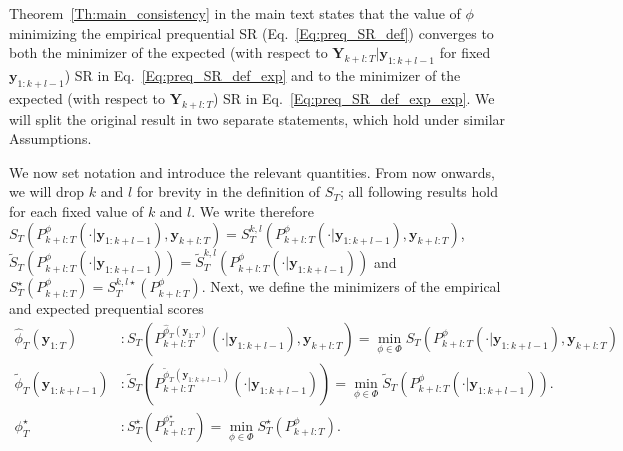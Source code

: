 \documentclass[twoside,11pt]{article}
\newcommand{\ddobs}{\mathbf{y}}
\newcommand{\ddobsupkplusl}{\mathbf{y}_{1:k+l-1}}
\newcommand{\DdobsupTfromk}{\mathbf{Y}_{k+l:T}}
\newcommand{\ddobsupT}{\mathbf{y}_{1:T}}
\newcommand{\ddobsupTfromk}{\mathbf{y}_{k+l:T}}
\begin{document}
	Theorem~\ref{Th:main_consistency} in the main text states that the value of $ \phi $ minimizing the empirical prequential SR (Eq.~\eqref{Eq:preq_SR_def}) converges to both the minimizer of the expected (with respect to $ \DdobsupTfromk|\ddobsupkplusl $ for fixed $ \ddobsupkplusl $) SR in Eq.~\eqref{Eq:preq_SR_def_exp} and to the minimizer of the expected (with respect to $ \DdobsupTfromk $) SR in Eq.~\eqref{Eq:preq_SR_def_exp_exp}. We will split the original result in two separate statements, which hold under similar Assumptions. 
	
	We now set notation and introduce the relevant quantities. From now onwards, we will drop $ k $ and $ l $ for brevity in the definition of $ S_T $; all following results hold for each fixed value of $ k $ and $ l $. We write therefore $ S_T(P_{k+l:T}^\phi(\cdot|\ddobs_{1:k+l-1}), \ddobs_{k+l:T}) = S_T^{k,l}(P_{k+l:T}^\phi(\cdot|\ddobs_{1:k+l-1}), \ddobs_{k+l:T}) $, $ 	\tilde S_T(P^\phi_{k+l:T}(\cdot|\ddobs_{1:k+l-1})) = 	\tilde S_T^{k,l}(P^\phi_{k+l:T}(\cdot|\ddobs_{1:k+l-1})) $ and $ S_T^{\star}(P^\phi_{k+l:T}) = S_T^{k,l\star}(P^\phi_{k+l:T})  $.
	Next, we define the minimizers of the empirical and expected prequential scores
	\begin{equation}\label{Eq:def_minimizers}
	\begin{aligned}
	\hat \phi_T(\ddobsupT) &:  S_T(P_{k+l:T}^{\hat\phi_T(\ddobsupT)}(\cdot|\ddobsupkplusl), \ddobsupTfromk)= \min_{\phi\in\Phi} S_T(P_{k+l:T}^\phi(\cdot|\ddobsupkplusl), \ddobsupTfromk)\\
	\tilde\phi_T(\ddobsupkplusl) &:  \tilde S_T(P^{\tilde\phi_T(\ddobsupkplusl)}_{k+l:T}(\cdot|\ddobs_{1:k+l-1})) = \min_{\phi\in\Phi} \tilde S_T(P^\phi_{k+l:T}(\cdot|\ddobs_{1:k+l-1})).\\	
	\phi^\star_T &:  S_T^\star(P_{k+l:T}^{\phi^\star_T})= \min_{\phi\in\Phi} S_T^\star(P^\phi_{k+l:T}).
	\end{aligned}
	\end{equation}
	
\end{document}
